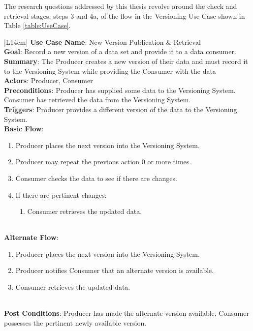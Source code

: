 The research questions addressed by this thesis revolve around the check and retrieval stages, steps 3 and 4a, of the flow in the Versioning Use Case shown in Table \ref{table:UseCase}.
\begin{table}
	\caption{Versioning Use Case Table}
	\label{table:UseCase}
	\centering
	\begin{tabular}{|L{14cm}|}
		\hline
		\textbf{Use Case Name}: New Version Publication \& Retrieval\\
		\hline
		\textbf{Goal}: Record a new version of a data set and provide it to a data consumer.\\
		\hline
		\textbf{Summary}: The Producer creates a new version of their data and must record it to the Versioning System while providing the Consumer with the data\\
		\hline
		\textbf{Actors}: Producer, Consumer\\
		\hline
		\textbf{Preconditions}: Producer has supplied some data to the Versioning System.   Consumer has retrieved the data from the Versioning System.\\
		\hline
		\textbf{Triggers}: Producer provides a different version of the data to the Versioning System.\\
		\hline
		\textbf{Basic Flow}: 
		\begin{enumerate}
			\item Producer places the next version into the Versioning System.
			\item Producer may repeat the previous action 0 or more times.
			\item Consumer checks the data to see if there are changes.
			\item If there are pertinent changes:
			\begin{enumerate}
				\item Consumer retrieves the updated data.
			\end{enumerate}
		\end{enumerate}\\
		\hline
		\textbf{Alternate Flow}:
		\begin{enumerate}
			\item Producer places the next version into the Versioning System.
			\item Producer notifies Consumer that an alternate version is available.
			\item Consumer retrieves the updated data.
		\end{enumerate}\\
		\hline
		\textbf{Post Conditions}: Producer has made the alternate version available.  Consumer possesses the pertinent newly available version.\\
		\hline
	\end{tabular}
\end{table}
